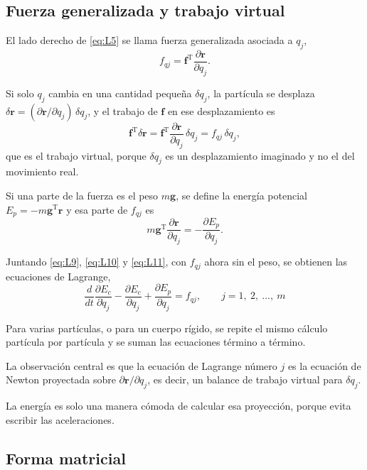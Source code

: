 \documentclass[11pt]{article}
\newcommand{\T}{^{\mathrm{T}}}
\newcommand{\pd}[2]{\frac{\partial #1}{\partial #2}}
\begin{document}
\subsection{Fuerza generalizada y trabajo virtual}

El lado derecho de \eqref{eq:L5} se llama fuerza generalizada asociada a $q_j$,
\begin{equation}
f_{qj}=\mathbf{f}\T\pd{\mathbf{r}}{q_j}.
\label{eq:L10}
\end{equation}

Si solo $q_j$ cambia en una cantidad pequeña $\delta q_j$, la partícula se desplaza $\delta\mathbf{r}=(\partial\mathbf{r}/\partial q_j)\,\delta q_j$, y el trabajo de $\mathbf{f}$ en ese desplazamiento es
\begin{equation}
\mathbf{f}\T\delta\mathbf{r}=\mathbf{f}\T\pd{\mathbf{r}}{q_j}\,\delta q_j=f_{qj}\,\delta q_j ,
\label{eq:L10b}
\end{equation}
que es el trabajo virtual, porque $\delta q_j$ es un desplazamiento imaginado y no el del movimiento real.

Si una parte de la fuerza es el peso $m\mathbf{g}$, se define la energía potencial $E_p=-m\mathbf{g}\T\mathbf{r}$ y esa parte de $f_{qj}$ es
\begin{equation}
m\mathbf{g}\T\pd{\mathbf{r}}{q_j}=-\pd{E_p}{q_j}.
\label{eq:L11}
\end{equation}

Juntando \eqref{eq:L9}, \eqref{eq:L10} y \eqref{eq:L11}, con $f_{qj}$ ahora sin el peso, se obtienen las ecuaciones de Lagrange,
\begin{equation}
\boxed{\ \frac{d}{dt}\pd{E_c}{\dot q_j}-\pd{E_c}{q_j}+\pd{E_p}{q_j}=f_{qj},
\qquad
j=1,\ 2,\ \dots,\ m\ }
\label{eq:L12}
\end{equation}

Para varias partículas, o para un cuerpo rígido, se repite el mismo cálculo partícula por partícula y se suman las ecuaciones término a término.

La observación central es que la ecuación de Lagrange número $j$ es la ecuación de Newton proyectada sobre $\partial\mathbf{r}/\partial q_j$, es decir, un balance de trabajo virtual para $\delta q_j$.

La energía es solo una manera cómoda de calcular esa proyección, porque evita escribir las aceleraciones.

\subsection{Forma matricial}
\end{document}
